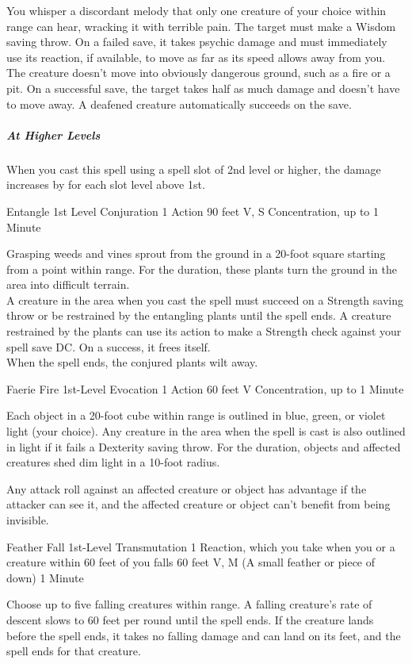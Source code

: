 \documentclass[letterpaper,openany,oneside,twocolumn]{book}
\begin{document}
You whisper a discordant melody that only one creature of your choice within range can hear, wracking it with terrible pain. The target must make a Wisdom saving throw. On a failed save, it takes  psychic damage and must immediately use its reaction, if available, to move as far as its speed allows away from you. The creature doesn't move into obviously dangerous ground, such as a fire or a pit. On a successful save, the target takes half as much damage and doesn't have to move away. A deafened creature automatically succeeds on the save.

\subparagraph*{At Higher Levels} When you cast this spell using a spell slot of 2nd level or higher, the damage increases by  for each slot level above 1st.

\DndSpellHeader
  {Entangle}
  {1st Level Conjuration}
  {1 Action}
  {90 feet}
  {V, S}
  {Concentration, up to 1 Minute}
  
Grasping weeds and vines sprout from the ground in a 20-foot square starting from a point within range. For the duration, these plants turn the ground in the area into difficult terrain.\\
A creature in the area when you cast the spell must succeed on a Strength saving throw or be restrained by the entangling plants until the spell ends. A creature restrained by the plants can use its action to make a Strength check against your spell save DC. On a success, it frees itself.\\
When the spell ends, the conjured plants wilt away.

\DndSpellHeader
  {Faerie Fire}
  {1st-Level Evocation}
  {1 Action}
  {60 feet}
  {V}
  {Concentration, up to 1 Minute}

Each object in a 20-foot cube within range is outlined in blue, green, or violet light (your choice). Any creature in the area when the spell is cast is also outlined in light if it fails a Dexterity saving throw. For the duration, objects and affected creatures shed dim light in a 10-foot radius.

Any attack roll against an affected creature or object has advantage if the attacker can see it, and the affected creature or object can't benefit from being invisible.

\DndSpellHeader
  {Feather Fall}
  {1st-Level Transmutation}
  {1 Reaction, which you take when you or a creature within 60 feet of you falls}
  {60 feet}
  {V, M (A small feather or piece of down)}
  {1 Minute}

Choose up to five falling creatures within range. A falling creature's rate of descent slows to 60 feet per round until the spell ends. If the creature lands before the spell ends, it takes no falling damage and can land on its feet, and the spell ends for that creature.
\end{document}
